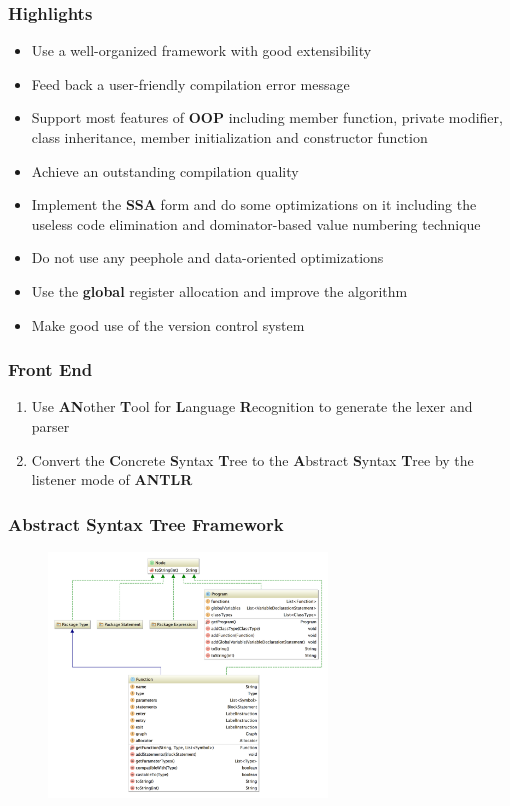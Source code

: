 \documentclass{beamer}
\begin{document}
	\begin{frame}
		\frametitle{Highlights}
		\begin{itemize}
			\item Use a well-organized framework with good extensibility
			\item Feed back a user-friendly compilation error message
			\item Support most features of \textbf{OOP} including member function, private modifier, class inheritance, member initialization and constructor function
			\item Achieve an outstanding compilation quality
			\item Implement the \textbf{SSA} form and do some optimizations on it including the useless code elimination and dominator-based value numbering technique
			\item Do not use any peephole and data-oriented optimizations
			\item Use the \textbf{global} register allocation and improve the algorithm
			\item Make good use of the version control system
		\end{itemize}
	\end{frame}

	\begin{frame}
		\frametitle{Front End}
		\begin{enumerate}
			\item Use \textbf{AN}other \textbf{T}ool for \textbf{L}anguage \textbf{R}ecognition to generate the lexer and parser
			\item Convert the \textbf{C}oncrete \textbf{S}yntax \textbf{T}ree to the \textbf{A}bstract \textbf{S}yntax \textbf{T}ree by the listener mode of \textbf{ANTLR}
		\end{enumerate}
	\end{frame}

	\begin{frame}
		\frametitle{Abstract Syntax Tree Framework}
		\begin{figure}[!htp]
			\includegraphics[height=6.5cm]{image/abstract-syntax-tree}
		\end{figure}
	\end{frame}
	
\end{document}
